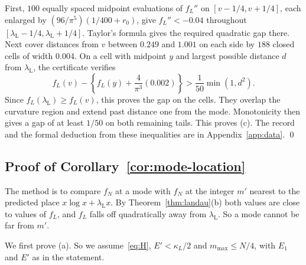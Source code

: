 First, $100$ equally spaced midpoint evaluations of $f_L''$ on
$[v-1/4,v+1/4]$, each enlarged by
$(96/\pi^5)(1/400+r_0)$, give $f_L''<-0.04$ throughout
$[\lambda_{\mathrm L}-1/4,\lambda_{\mathrm L}+1/4]$.
Taylor's formula gives the required quadratic gap there.
Next cover distances from $v$ between $0.249$ and $1.001$ on each
side by $188$ closed cells of width $0.004$. On a cell with midpoint
$y$ and largest possible distance $d$ from $\lambda_{\mathrm L}$,
the certificate verifies
\[
 f_L(v)-\left\{f_L(y)+\frac4{\pi^3}(0.002)\right\}
 >\frac1{50}\min(1,d^2).
\]
Since $f_L(\lambda_{\mathrm L})\ge f_L(v)$, this proves the gap on
the cells. They overlap the curvature region and extend past distance
one from the mode. Monotonicity then gives a gap of at least $1/50$
on both remaining tails. This proves (c). The record and the formal
deduction from these inequalities are in Appendix~\ref{app:data}. \qed

\subsection{Proof of Corollary~\ref{cor:mode-location}}\label{app:bulk-cor}

The method is to compare $f_N$ at a mode with $f_N$ at the integer $m'$
nearest to the predicted place $x\log x+\lambda_{\mathrm L}x$. By
Theorem~\ref{thm:landau}(b) both values are close to values of $f_L$, and
$f_L$ falls off quadratically away from $\lambda_{\mathrm L}$. So a mode cannot be far
from $m'$.

We first prove (a). So we assume~\eqref{eq:H}, $E'<\kappa_L/2$ and $m_{\max}\le N/4$, with
$E_1$ and $E'$ as in the statement.

